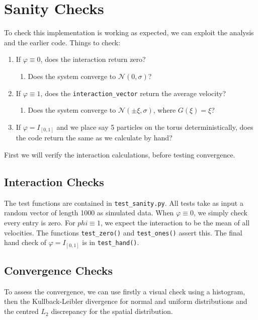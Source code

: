 \documentclass[11pt,a4paper, dvipsnames]{article}
\renewcommand{\phi}{\varphi}
\begin{document}
    \section{Sanity Checks}
        To check this implementation is working as expected, we can exploit the analysis and the earlier code. Things to check:
        \begin{enumerate}
            \item If $\phi\equiv 0$, does the interaction return zero?
            \begin{enumerate}
                 \item  Does the system converge to $\mathcal{N}(0,\sigma)$?
            \end{enumerate}
            \item If $\phi \equiv 1$, does the \texttt{interaction\_vector} return the average velocity?
            \begin{enumerate}
                 \item  Does the system converge to $\mathcal{N}(\pm \xi,\sigma)$, where $G(\xi)=\xi$? 
            \end{enumerate}
            \item If $\phi = I_{[0,1]}$ and we place say 5 particles on the torus deterministically, does the code return the same as we calculate by hand?
        \end{enumerate}
        First we will verify the interaction calculations, before testing convergence.
        
        \subsection{Interaction Checks}
        The test functions are contained in \verb|test_sanity.py|. All tests take as input a random vector of length 1000 as simulated data. When $\phi \equiv 0$, we simply check every entry is zero. For $phi \equiv 1$, we expect the interaction to be the mean of all velocities. The functions \verb|test_zero()| and \verb|test_ones()| assert this. The final hand check of $\phi = I_{[0,1]}$ is in \verb|test_hand()|.
        
        \subsection{Convergence Checks}
        To assess the convergence, we can use firstly a visual check using a histogram, then the Kullback-Leibler divergence for normal and uniform distributions and the centred $L_2$ discrepancy for the spatial distribution.
        
\end{document}
